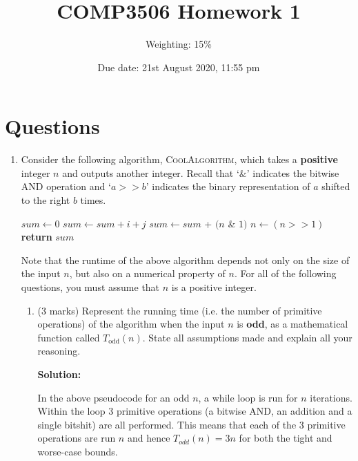\documentclass[a4,13pt]{extarticle}
\title{COMP3506 Homework 1}
\author{Weighting: 15\%}
\date{Due date: 21st August 2020, 11:55 pm}
\newenvironment{Solution}{\color{blue}\textbf{Solution:}}{}
\begin{document}
\maketitle

\section*{Questions}

\begin{enumerate}
	\item   
	      Consider the following algorithm, \textsc{CoolAlgorithm}, which takes a \textbf{positive} integer $n$ and outputs another integer. 
	      Recall that `$\&$' indicates the bitwise AND operation and `$a >> b$' indicates the binary representation of $a$ shifted to the right $b$ times.
	      	      
	      \begin{algorithm}
	      	\begin{algorithmic}[1]
	      		\State $sum \gets 0$
	      		\State $sum \gets sum + i + j$ 
	      		\EndFor 
	      		\EndFor
	      		\Else
	      		\State $sum \gets sum$ + $(n$ \& $1)$
	      		\State $n \gets (n >> 1)$
	      		\EndWhile
	      		\EndIf
	      		\State \textbf{return} $sum$
	      		\EndProcedure
	      	\end{algorithmic}
	      \end{algorithm}
	      	          
	      Note that the runtime of the above algorithm depends not only on the size of the input $n$, but also on a numerical property of $n$. 
	      For all of the following questions, you must assume that $n$ is a positive integer.
	      	      
	      \begin{enumerate}
	      	\item (3 marks) Represent the running time (i.e. the number of primitive operations) of the algorithm when the input $n$ is \textbf{odd}, as a mathematical function called $T_{\text{odd}}(n)$. State all assumptions made and explain all your reasoning.
	      	      
			\begin{Solution}

				In the above pseudocode for an odd $n$, a while loop is run for $n$ iterations. Within the loop 3 primitive operations (a bitwise AND, an addition and a single bitshit) are all performed. This means that each of the 3 primitive operations are run $n$ and hence $T_{odd}(n) = 3n$ for both the tight and worse-case bounds.
			\end{Solution}


\end{enumerate}
\end{enumerate}
\end{document}
